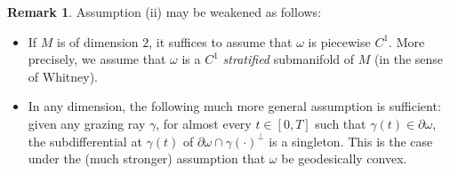 \documentclass[10pt]{amsart}
\theoremstyle{definition}
\newtheorem{remark}{Remark}
\begin{document}
\begin{remark}\label{remgen}
Assumption (ii) may be weakened as follows:
\begin{itemize}
\item If $M$ is of dimension $2$, it suffices to assume that $\omega$ is piecewise $C^1$. More precisely, we assume that $\omega$ is a $C^1$ \emph{stratified} submanifold of $M$ (in the sense of Whitney).
\item In any dimension, the following much more general assumption is sufficient: given any grazing ray $\gamma$, for almost every $t\in[0,T]$ such that $\gamma(t)\in\partial\omega$, the subdifferential at $\gamma(t)$ of $\partial\omega\cap\gamma(\cdot)^\perp$ is a singleton.
This is the case under the (much stronger) assumption that $\omega$ be geodesically convex.
\end{itemize}
\end{remark}
\end{document}
